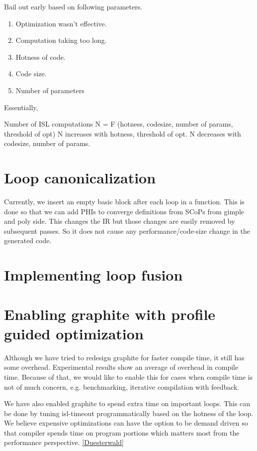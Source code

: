 Bail out early based on following parameters.
\begin{enumerate}
  \item Optimization wasn't effective.
  \item Computation taking too long.
  \item Hotness of code.
  \item Code size.
  \item Number of parameters
\end{enumerate}

Essentially,

Number of ISL computations N = F (hotness, codesize, number of params, threshold of opt)
N increases with hotness, threshold of opt.
N decreases with codesize, number of params.


\section{Loop canonicalization}
Currently, we insert an empty basic block after each loop in a function. This is done so that
we can add PHIs to converge definitions from SCoPs from gimple and poly side. This changes
the IR but those changes are easily removed by subsequent passes. So it does not cause any
performance/code-size change in the generated code.


\section{Implementing loop fusion}

\section{Enabling graphite with profile guided optimization}
Although we have tried to redesign graphite for faster compile time, it still has some overhead.
Experimental results show an average of {} overhead in compile time.
Because of that, we would like to enable this for cases when compile time is not of much concern,
e.g. benchmarking, iterative compilation with feedback.

We have also enabled graphite to spend extra time on important loops. This can be done by tuning
isl-timeout programmatically based on the hotness of the loop. We believe expensive optimizations
can have the option to be demand driven so that compiler spends time on program portions which matters
most from the performance perspective. \ref{Duesterwald}


